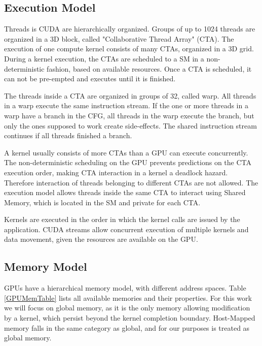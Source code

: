 \subsection{Execution Model}
Threads is CUDA are hierarchically organized. Groups of up to 1024 threads are organized in a 3D block, called "Collaborative Thread Array" (CTA). The execution of one compute kernel consists of many CTAs, organized in a 3D grid. During a kernel execution, the CTAs are  scheduled to a SM in a non-deterministic fashion, based on available resources. Once a CTA is scheduled, it can not be pre-empted and executes until it is finished. 

The threads inside a CTA are organized in groups of 32, called warp. All threads in a warp execute the same instruction stream. If the one or more threads in a warp have a branch in the CFG, all threads in the warp
execute the branch, but only the ones supposed to work create side-effects. The shared instruction stream continues if all threads finished a branch.

A kernel usually consists of more CTAs than a GPU can execute concurrently. The non-deterministic scheduling on the GPU  prevents predictions on the CTA execution order, making CTA interaction
in a kernel a deadlock hazard. Therefore interaction of threads belonging to different CTAs are not allowed. The execution model allows threads inside the same CTA to interact using Shared Memory, which is located in the SM and private for each CTA.

Kernels are executed in the order in which the kernel calls are issued by the application. CUDA streams allow concurrent  execution of multiple kernels and data movement, given the resources are available on the GPU.
\subsection{Memory Model}
GPUs have a hierarchical memory model, with different address spaces. Table \ref{GPUMemTable} lists all available memories and their properties. For this work we will focus on global memory, as it is the only 
memory allowing modification by a kernel, which persist beyond the kernel completion boundary.
Host-Mapped memory falls in the same category as global, and for our purposes is treated as global memory. 

